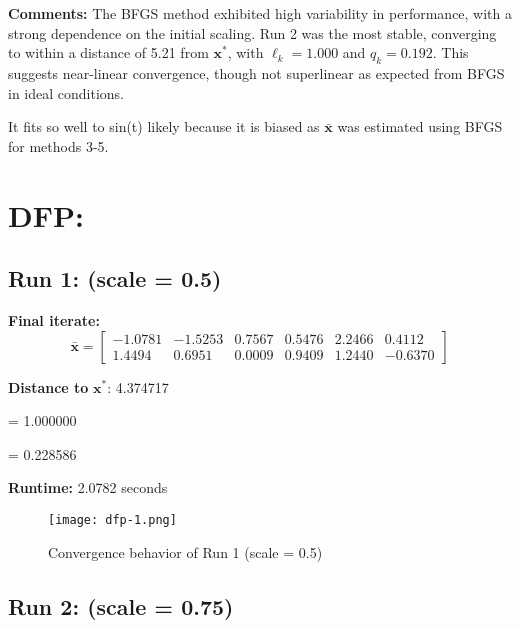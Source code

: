\documentclass{article}
\begin{document}
\vspace{0.5em}

\noindent
\textbf{Comments:} The BFGS method exhibited high variability in performance, with a strong dependence on the initial scaling. Run 2 was the most stable, converging to within a distance of 5.21 from $\mathbf{x}^*$, with $\ell_k = 1.000$ and $q_k = 0.192$. This suggests near-linear convergence, though not superlinear as expected from BFGS in ideal conditions.

It fits so well to sin(t) likely because it is biased as $\bar{\mathbf{x}}$ was estimated using BFGS for methods 3-5.

\section*{DFP:}

\subsection*{Run 1: (scale = 0.5)}
\vspace{1em}

\textbf{Final iterate:}
\[
\bar{\mathbf{x}} =
\begin{bmatrix}
-1.0781 & -1.5253 & 0.7567 & 0.5476 & 2.2466 & 0.4112 \\
1.4494 & 0.6951 & 0.0009 & 0.9409 & 1.2440 & -0.6370
\end{bmatrix}
\]

\vspace{0.5em}
\noindent
\textbf{Distance to } $\mathbf{x}^*$: 4.374717

\vspace{0.5em}
\noindent
{} = 1.000000

\noindent
{} = 0.228586

\vspace{0.5em}
\noindent
\textbf{Runtime:} 2.0782 seconds

\begin{figure}[H]
    \centering
    \texttt{[image: dfp-1.png]}
    \caption{Convergence behavior of Run 1 (scale = 0.5)}
    \label{fig:dfp-run1}
\end{figure}


\subsection*{Run 2: (scale = 0.75)}
\vspace{1em}
\end{document}
